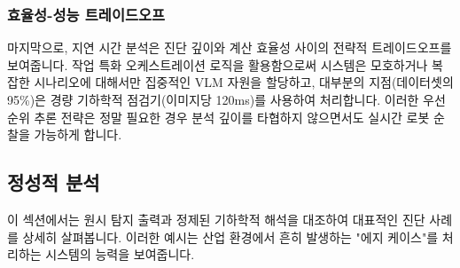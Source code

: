 \subsubsection{효율성-성능 트레이드오프}
마지막으로, 지연 시간 분석은 진단 깊이와 계산 효율성 사이의 전략적 트레이드오프를 보여줍니다.
작업 특화 오케스트레이션 로직을 활용함으로써 시스템은 모호하거나 복잡한 시나리오에 대해서만 집중적인 VLM 자원을 할당하고, 대부분의 지점(데이터셋의 95\%)은 경량 기하학적 점검기(이미지당 120ms)를 사용하여 처리합니다.
이러한 우선순위 추론 전략은 정말 필요한 경우 분석 깊이를 타협하지 않으면서도 실시간 로봇 순찰을 가능하게 합니다.

\subsection{정성적 분석}
이 섹션에서는 원시 탐지 출력과 정제된 기하학적 해석을 대조하여 대표적인 진단 사례를 상세히 살펴봅니다.
이러한 예시는 산업 환경에서 흔히 발생하는 "에지 케이스"를 처리하는 시스템의 능력을 보여줍니다.


